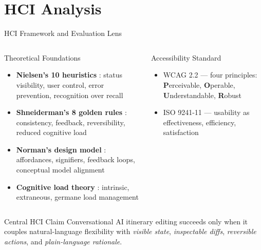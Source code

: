 \documentclass[aspectratio=169,professionalfonts]{beamer}
\newcommand{\hl}[1]{\textbf{\textcolor{ysblue}{#1}}}
\begin{document}
\section{HCI Analysis}

\begin{frame}{HCI Framework and Evaluation Lens}
  \begin{columns}[T]
    \begin{block}{Theoretical Foundations}
      \begin{itemize}
        \item \hl{Nielsen's 10 heuristics} \cite{nielsen1994}: status visibility,
              user control, error prevention, recognition over recall
        \item \hl{Shneiderman's 8 golden rules} \cite{shneiderman2016}:
              consistency, feedback, reversibility, reduced cognitive load
        \item \hl{Norman's design model} \cite{norman2013}:
              affordances, signifiers, feedback loops, conceptual model alignment
        \item \hl{Cognitive load theory} \cite{sweller2011}:
              intrinsic, extraneous, germane load management
      \end{itemize}
    \end{block}

    \begin{block}{Accessibility Standard}
      \begin{itemize}
        \item WCAG 2.2 \cite{wcag22} — four principles:
              \textbf{P}erceivable, \textbf{O}perable,
              \textbf{U}nderstandable, \textbf{R}obust
        \item ISO 9241-11 \cite{iso9241} — usability as
              effectiveness, efficiency, satisfaction
      \end{itemize}
    \end{block}
  \end{columns}

  \vspace{0.2cm}
  \begin{alertblock}{Central HCI Claim}
    Conversational AI itinerary editing succeeds only when it couples
    natural-language flexibility with \emph{visible state}, \emph{inspectable diffs},
    \emph{reversible actions}, and \emph{plain-language rationale}.
  \end{alertblock}
\end{frame}
\end{document}
